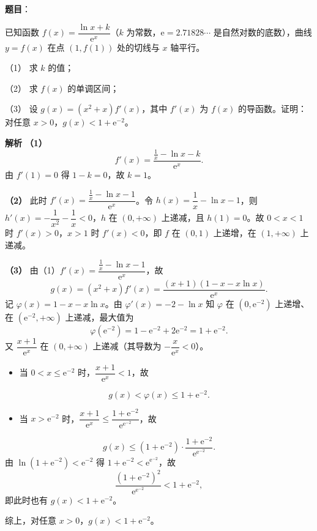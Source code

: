 \begin{answer}

\textbf{题目}：

已知函数 $f(x)=\dfrac{\ln x+k}{\mathrm e^x}$（$k$ 为常数，$\mathrm e=2.71828\cdots$ 是自然对数的底数），曲线 $y=f(x)$ 在点 $(1,f(1))$ 处的切线与 $x$ 轴平行。

（1） 求 $k$ 的值；

（2） 求 $f(x)$ 的单调区间；

（3） 设 $g(x)=(x^2+x)f'(x)$，其中 $f'(x)$ 为 $f(x)$ 的导函数。证明：对任意 $x>0$，$g(x)<1+\mathrm e^{-2}$。

\textbf{解析}
\textbf{（1）}
\nopagebreak[4]
\[f'(x)=\frac{\frac1x-\ln x-k}{\mathrm e^x}.\]
由 $f'(1)=0$ 得 $1-k=0$，故 $k=1$。

\textbf{（2）} 此时 $f'(x)=\dfrac{\frac1x-\ln x-1}{\mathrm e^x}$。令 $h(x)=\dfrac1x-\ln x-1$，则 $h'(x)=-\dfrac1{x^2}-\dfrac1x<0$，$h$ 在 $(0,+\infty)$ 上递减，且 $h(1)=0$。故 $0<x<1$ 时 $f'(x)>0$，$x>1$ 时 $f'(x)<0$，即 $f$ 在 $(0,1)$ 上递增，在 $(1,+\infty)$ 上递减。

\textbf{（3）} 由（1）$f'(x)=\dfrac{\frac1x-\ln x-1}{\mathrm e^x}$，故
\nopagebreak[4]
\[g(x)=(x^2+x)f'(x)=\frac{(x+1)\left(1-x-x\ln x\right)}{\mathrm e^x}.\]
记 $\varphi(x)=1-x-x\ln x$。由 $\varphi'(x)=-2-\ln x$ 知 $\varphi$ 在 $\left(0,\mathrm e^{-2}\right)$ 上递增、在 $\left(\mathrm e^{-2},+\infty\right)$ 上递减，最大值为
\nopagebreak[4]
\[\varphi\left(\mathrm e^{-2}\right)=1-\mathrm e^{-2}+2\mathrm e^{-2}=1+\mathrm e^{-2}.\]
又 $\dfrac{x+1}{\mathrm e^x}$ 在 $(0,+\infty)$ 上递减（其导数为 $-\dfrac{x}{\mathrm e^x}<0$）。

\begin{itemize}
\item 当 $0<x\leqslant\mathrm e^{-2}$ 时，$\dfrac{x+1}{\mathrm e^x}<1$，故
\end{itemize}
\nopagebreak[4]
\[g(x)<\varphi(x)\leqslant1+\mathrm e^{-2}.\]
\begin{itemize}
\item 当 $x>\mathrm e^{-2}$ 时，$\dfrac{x+1}{\mathrm e^x}\leqslant\dfrac{1+\mathrm e^{-2}}{\mathrm e^{\mathrm e^{-2}}}$，故
\end{itemize}
\nopagebreak[4]
\[g(x)\leqslant\left(1+\mathrm e^{-2}\right)\cdot\frac{1+\mathrm e^{-2}}{\mathrm e^{\mathrm e^{-2}}}.\]
由 $\ln\left(1+\mathrm e^{-2}\right)<\mathrm e^{-2}$ 得 $1+\mathrm e^{-2}<\mathrm e^{\mathrm e^{-2}}$，故
\nopagebreak[4]
\[\frac{\left(1+\mathrm e^{-2}\right)^2}{\mathrm e^{\mathrm e^{-2}}}<1+\mathrm e^{-2},\]
即此时也有 $g(x)<1+\mathrm e^{-2}$。

综上，对任意 $x>0$，$g(x)<1+\mathrm e^{-2}$。




\end{answer}